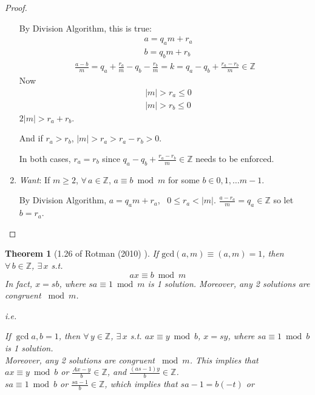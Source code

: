 \documentclass[10pt]{amsart}
\newtheorem{theorem}{Theorem}
\begin{document}
\begin{multicols*}{2}
\begin{proof}
\begin{enumerate}
	By Division Algorithm, this is true: 
	\[
	\begin{aligned}
	& a=q_a m + r_a \\ 
	 & b= q_b m + r_b 
	\end{aligned}
	\] 
	\[
	\begin{gathered}
	\frac{a-b}{m} = q_a + \frac{r_a}{m} - q_b - \frac{r_b}{m} = k = q_a - q_b + \frac{r_a - r_b}{m} \in \mathbb{Z}
	\end{gathered}
	\]
	Now 
	\[
	\begin{aligned}
	& |m| > r_a \leq 0 \\ 
	& |m| > r_b \leq 0 
	\end{aligned}
		\]
		$2|m| > r_a + r_b$.  
		
		And if $r_a > r_b$, $|m| > r_a > r_a -r_b > 0$.  
		
		In both cases, $r_a=r_b$ since $q_a - q_b + \frac{r_a - r_b}{m} \in \mathbb{Z}$ needs to be enforced.   
		
	\item \emph{Want}: If $m\geq 2$, $\forall \, a \in \mathbb{Z}$, $a \equiv b \bmod{m}$ for some $b\in 0,1,\dots m-1$.  
	
	By Division Algorithm, $a = q_a m + r_a$, \, $0 \leq r_a < |m|$.  $\frac{a-r_a}{m} = q_a \in \mathbb{Z}$ so let $b= r_a$.  
	
\end{enumerate}	
\end{proof}

\begin{theorem}[1.26 of Rotman (2010) \cite{JRotman2010}]\label{Thm:relprimeinvertible} 
If $\text{gcd}(a,m) \equiv (a,m) = 1$, then $\forall \, b \in \mathbb{Z}$, $\exists \, x $ s.t. 
\[
ax \equiv b\bmod{m}
\]
In fact, $x=sb$, where $sa\equiv 1\bmod{m}$ is 1 solution.  Moreover, any 2 solutions are congruent $\bmod{m}$.

i.e.  %

If $\gcd{a,b} = 1$, then $\forall \, y \in \mathbb{Z}$, $\exists \, x$ s.t. $ax \equiv y \bmod{b}$, $x=sy$, where $sa\equiv 1\bmod{b}$ is 1 solution.  \\
Moreover, any 2 solutions are congruent $\bmod{m}$.  This implies that    \\

$ax\equiv y \bmod{b}$ or $\frac{Ax-y}{b} \in \mathbb{Z}$, and $\frac{(as-1)y }{b} \in \mathbb{Z}$.  \\
$sa \equiv 1 \bmod{b}$ or $\frac{sa-1}{b} \in \mathbb{Z}$, which implies that $sa-1 = b(-t)$ or 


\end{theorem}
\end{multicols*}
\end{document}

